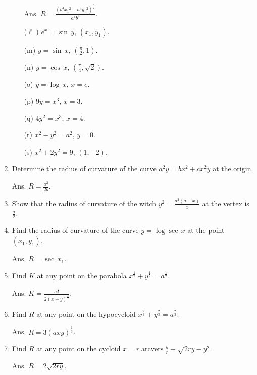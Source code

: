 \begin{enumerate}
\begin{itemize}
Ans. $R = \frac{(b^4 {x_1}^2 + a^4 {y_1}^2)^{\frac{3}{2}}}{a^4 b^4}$.

\item[($\ell$ )]
 $e^x = \sin\, y$, $(x_1,y_1)$.

\item[(m)]
 $y = \sin\, x$, 
$\left( \frac{\pi}{2}, 1 \right)$. 

\item[(n)]
 $y = \cos\, x$, 
$\left( \frac{\pi}{4}, \sqrt{2} \right)$.

\item[(o)]
 $y = \log\, x$, $x = e$.

\item[(p)]
 $9y = x^3$, $x = 3$.

\item[(q)]
 $4y^2 = x^3$, $x = 4$.

\item[(r)]
 $x^2 - y^2 = a^2$, $y = 0$.

\item[(s)]
 $x^2 + 2y^2 = 9$, $(1, - 2)$.
\end{itemize}

\item
 Determine the radius of curvature of the curve 
$a^2y = bx^2 + cx^2y$ at the origin.

Ans. $R = \frac{a^2}{2b}$.

\item
Show that the radius of curvature of the witch 
$y^2 = \frac{a^2 (a - x)}{x}$ at the vertex is $\frac{a}{2}$.

\item
Find the radius of curvature of the curve 
$y = \log\sec\, x$ at the point $(x_1,y_1)$.

Ans. $R = \sec\, x_1$.

\item
Find $K$ at any point on the parabola 
$x^{\frac{1}{2}} + y^{\frac{1}{2}} = a^{\frac{1}{2}}$. 

Ans. $K = \frac{ a^{\frac{1}{2}} }{ 2(x + y)^{\frac{3}{2}} }$.

\item
Find $R$ at any point on the hypocycloid 
$x^{\frac{2}{3}} + y^{\frac{2}{3}} = a^{\frac{2}{3}}$. 

Ans. $R = 3 (axy)^{\frac{1}{3}}$.

\item
Find $R$ at any point on the cycloid 
$x = r \operatorname{arcvers} \frac{y}{r} - \sqrt{2ry - y^2}$. 

Ans. $R = 2 \sqrt{2ry}$.

\end{enumerate}

